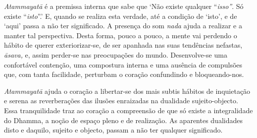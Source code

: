 \emph{Atammayatā} é a premissa interna que sabe que `Não existe qualquer
``\emph{isso''}. Só existe ``\emph{isto}''.' E, quando se realiza esta
verdade, até a condição de `isto', e de `aqui' passa a não ter
significado. A presença do som \emph{nada} ajuda a realizar e a manter
tal perspectiva. Desta forma, pouco a pouco, a mente vai perdendo o
hábito de querer exteriorizar-se, de ser apanhada nas suas tendências
nefastas, \emph{āsava,} e, assim perder-se nas preocupações do mundo.
Desenvolve-se uma confortável contenção, uma compostura interna e uma
ausência de compulsões que, com tanta facilidade, perturbam o coração
confundindo e bloqueando-nos.

\emph{Atammayatā} ajuda o coração a libertar-se dos mais subtis hábitos
de inquietação e serena as reverberações das ilusões enraizadas na
dualidade sujeito-objecto. Essa tranquilidade traz ao coração a
compreensão de que só existe a integralidade do Dhamma, a noção de
espaço pleno e de realização. As aparentes dualidades disto e daquilo,
sujeito e objecto, passam a não ter qualquer significado.

